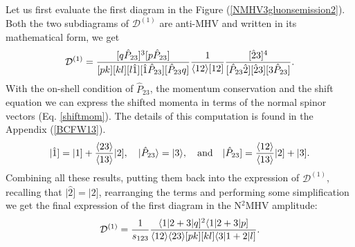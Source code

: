 Let us first evaluate the first diagram in the Figure (\ref{NMHV3gluonsemission2}). Both the two subdiagrams of $\mathcal{D}^{(1)}$ are anti-MHV and written in its mathematical form, we get
\begin{equation}
\mathcal{D}^{(1)}=\frac{[q\hat{P}_{23}]^3[p\hat{P}_{23}]}{[pk] [kl] [l\hat{1}] [\hat{1} \hat{P}_{23}] [\hat{P}_{23} q]} \frac{1}{\langle12\rangle[12]} \frac{[\hat{2}3]^4}{[\hat{P}_{23} \hat{2}] [\hat{2}3] [3\hat{P}_{23}]}. 
\end{equation}
With the on-shell condition of $\hat{P}_{23}$, the momentum conservation and the shift equation we can express the shifted momenta in terms of the normal spinor vectors (Eq. \ref{shiftmom}). The details of this computation is found in the Appendix (\ref{BCFW13}).  
\begin{equation}
\vert \hat{1}]=\vert 1]+\frac{\langle23\rangle}{\langle13\rangle} \vert 2], \quad \vert \hat{P}_{23}\rangle =\vert 3\rangle, \quad \text{and} \quad \vert \hat{P}_{23}]=\frac{\langle12\rangle}{\langle13\rangle} \vert 2]+\vert 3].
\label{shiftmom}
\end{equation}
Combining all these results, putting them back into the expression of $\mathcal{D}^{(1)}$, recalling that $\vert \hat{2}]=\vert 2]$, rearranging the terms and performing some simplification we get the final expression of the first diagram in the N$^2$MHV amplitude:
\begin{equation}
\mathcal{D}^{(1)}=\frac{1}{s_{123}} \frac{\langle 1\vert 2+3\vert q]^2 \langle 1\vert 2+3\vert p]}{\langle12\rangle \langle23\rangle [pk] [kl] \langle 3\vert 1+2\vert l]}. 
\end{equation}

